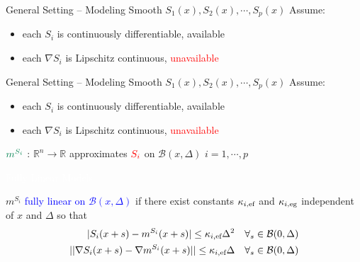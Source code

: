 \documentclass[handout,aspectratio=54]{beamer}
\numberwithin{theorem}{section}
\begin{document}
\begin{frame}{General Setting – Modeling Smooth $S_1(x),S_2(x),\cdots,S_p(x)$}
Assume:
\begin{itemize}
\item each $S_i$ is \textcolor[RGB]{0,130,80}{continuously differentiable, available}
\item each $\nabla S_i$ is \textcolor[RGB]{0,130,80}{Lipschitz continuous,} \textcolor{red}{unavailable}
\end{itemize}
\vspace{5cm}
\end{frame}

\begin{frame}{General Setting – Modeling Smooth $S_1(x),S_2(x),\cdots,S_p(x)$}
Assume:
\begin{itemize}
\item each $S_i$ is \textcolor[RGB]{0,130,80}{continuously differentiable, available}
\item each $\nabla S_i$ is \textcolor[RGB]{0,130,80}{Lipschitz continuous,} \textcolor{red}{unavailable}
\end{itemize}

$\textcolor[RGB]{0,130,80}{m^{S_i}}$ : $\mathbb{R}^n\rightarrow\mathbb{R}$ approximates $\textcolor{red}{S_i}$ on $\mathcal{B}(x,\Delta)$
\flushright $i=1,\cdots,p$

\flushleft
\colorbox[rgb]{0.5,0.6,0.7}{\textcolor{white}{Fully Linear Models}}

$m^{S_i}$ \textcolor{blue}{fully linear on $\mathcal{B}(x,\Delta)$} if there exist constants $\kappa_{i,\textup{ef}}$ and $\kappa_{i,\textup{eg}}$ independent of $x$ and $\Delta$ so that
\begin{align*}
|S_i(x+s)-m^{S_i}(x+s)|\le\kappa_{i,\textup{ef}}\Delta^2\quad & \forall_s\in\mathcal{B}(0,\Delta)\\
||\nabla S_i(x+s)-\nabla m^{S_i}(x+s)||\le\kappa_{i,\textup{ef}}\Delta\quad & \forall_s\in\mathcal{B}(0,\Delta)
\end{align*}
\end{frame}
\end{document}
